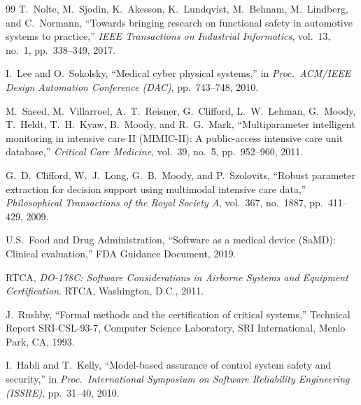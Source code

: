 \begin{thebibliography}{99}
T.~Nolte, M.~Sjodin, K.~Akesson, K.~Lundqvist, M.~Behnam, M.~Lindberg,
and C.~Normann,
``Towards bringing research on functional safety in automotive systems to practice,''
\emph{IEEE Transactions on Industrial Informatics}, vol.~13, no.~1, pp.~338--349, 2017.


I.~Lee and O.~Sokolsky,
``Medical cyber physical systems,''
in \emph{Proc.\ ACM/IEEE Design Automation Conference (DAC)}, pp.~743--748, 2010.

M.~Saeed, M.~Villarroel, A.~T.~Reisner, G.~Clifford, L.~W.~Lehman, G.~Moody,
T.~Heldt, T.~H.~Kyaw, B.~Moody, and R.~G.~Mark,
``Multiparameter intelligent monitoring in intensive care II (MIMIC-II):
A public-access intensive care unit database,''
\emph{Critical Care Medicine}, vol.~39, no.~5, pp.~952--960, 2011.

G.~D.~Clifford, W.~J.~Long, G.~B.~Moody, and P.~Szolovits,
``Robust parameter extraction for decision support using multimodal intensive care data,''
\emph{Philosophical Transactions of the Royal Society A}, vol.~367, no.~1887,
pp.~411--429, 2009.

U.S.\ Food and Drug Administration,
``Software as a medical device (SaMD): Clinical evaluation,''
FDA Guidance Document, 2019.


RTCA,
\emph{DO-178C: Software Considerations in Airborne Systems and Equipment Certification}.
RTCA, Washington, D.C., 2011.

J.~Rushby,
``Formal methods and the certification of critical systems,''
Technical Report SRI-CSL-93-7, Computer Science Laboratory,
SRI International, Menlo Park, CA, 1993.

I.~Habli and T.~Kelly,
``Model-based assurance of control system safety and security,''
in \emph{Proc.\ International Symposium on Software Reliability Engineering (ISSRE)},
pp.~31--40, 2010.



\end{thebibliography}
